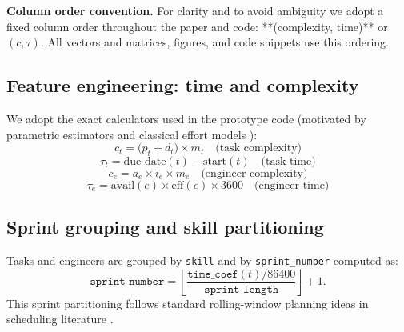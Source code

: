 \documentclass[journal]{IEEEtran}
\begin{document}
\noindent\textbf{Column order convention.} For clarity and to avoid ambiguity we adopt a fixed column order throughout the paper and code: **(complexity, time)** or \((c,\tau)\). All vectors and matrices, figures, and code snippets use this ordering.

\subsection{Feature engineering: time and complexity}
We adopt the exact calculators used in the prototype code (motivated by parametric estimators and classical effort models \cite{cocomo,parametric_estimate}):
\begin{equation}
c_t = \big(p_t + d_t \big) \times m_t  \quad \text{(task complexity)} \label{eq:task_complexity}
\end{equation}
\begin{equation}
\tau_t = \mathrm{due\_date}(t) - \mathrm{start}(t) \quad \text{(task time)} \label{eq:task_time}
\end{equation}
\begin{equation}
c_e = a_e \times i_e \times m_e  \quad \text{(engineer complexity)} \label{eq:eng_complexity}
\end{equation}
\begin{equation}
\tau_e = \mathrm{avail}(e) \times \mathrm{eff}(e) \times 3600 \quad \text{(engineer time)} \label{eq:eng_time}
\end{equation}

\subsection{Sprint grouping and skill partitioning}
Tasks and engineers are grouped by \texttt{skill} and by \texttt{sprint\_number} computed as:
\[
\texttt{sprint\_number} = \left\lfloor \frac{\texttt{time\_coef}(t) / 86400}{\texttt{sprint\_length}} \right\rfloor + 1.
\]
This sprint partitioning follows standard rolling-window planning ideas in scheduling literature \cite{RollingHorizonSurvey2010,karger_sched_notes}.
\end{document}
